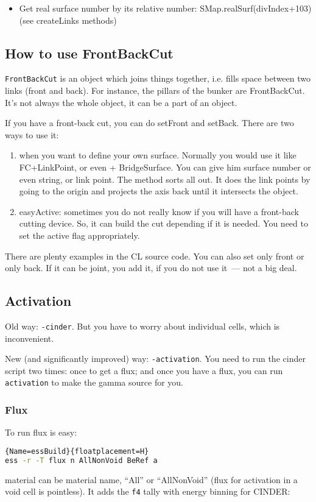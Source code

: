 \begin{itemize}
\item Get real surface number by its relative number: SMap.realSurf(divIndex+103) (see createLinks methods)
\end{itemize}

\subsection{How to use FrontBackCut}
{\tt FrontBackCut} is an object which joins things together, i.e. fills space between two links (front and back).
For instance, the pillars of the bunker are FrontBackCut.
It's not always the whole object, it can be a part of an object.

If you have a front-back cut, you can do setFront and setBack. There are two ways to use it:
\begin{enumerate}
\item when you want to define your own surface. Normally you would use it like FC+LinkPoint, or even + BridgeSurface.
  You can give him surface number or even string, or link point. The method sorts all out.
  It does the link points by going to the origin and projects the axis back until it intersects the object.
\item easyActive: sometimes you do not really know if you will have a front-back cutting device. So, it can build the cut depending if it is needed.
  You need to set the active flag appropriately.
\end{enumerate}
There are plenty examples in the CL source code. You can also set only front or only back.
If it can be joint, you add it, if you do not use it~--- not a big deal.


\subsection{Activation}
Old way: {\tt -cinder}. But you have to worry about individual cells, which is inconvenient.

New (and significantly improved) way: {\tt -activation}.
You need to run the cinder script two times: once to get a flux; and once you have a flux, you can run {\tt activation} to make the gamma source for you.

\subsubsection{Flux}
To run flux is easy:
\begin{lstlisting}[language=bash]{Name=essBuild}{floatplacement=H}
ess -r -T flux n AllNonVoid BeRef a
\end{lstlisting}
material can be material name, ``All'' or ``AllNonVoid'' (flux for activation in a void cell is pointless).
It adds the {\tt f4} tally with energy binning for CINDER:

